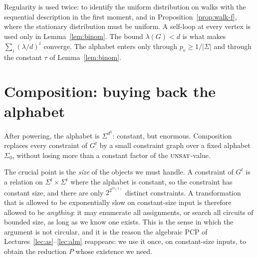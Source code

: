 \begin{remark}\label{rem:hypotheses}
Regularity is used twice: to identify the uniform distribution on walks with the sequential description in the first moment, and in Proposition~\ref{prop:walk-f}, where the stationary distribution must be uniform.
A self-loop at every vertex is used only in Lemma~\ref{lem:binom}.  The bound $\lambda(G)<d$ is what makes $\sum_i(\lambda/d)^i$ converge.  The alphabet enters only through $p_v\ge1/|\Sigma|$ and through the constant $\tau$ of Lemma~\ref{lem:binom}.
\end{remark}


\section{Composition: buying back the alphabet}
\label{sec:comp}

After powering, the alphabet is $\Sigma^{d^{h}}$: constant, but enormous.  Composition replaces every constraint of $G^t$ by a small constraint graph over a fixed alphabet $\Sigma_0$, without losing more than a constant factor of the $\textsc{unsat}$-value.

The crucial point is the \emph{size} of the objects we must handle.  A constraint of $G^t$ is a relation on $\Sigma^{t}\times\Sigma^{t}$ where the alphabet is constant, so the constraint has constant size, and there are only $2^{2^{O(1)}}$ distinct constraints.  A transformation that is allowed to be exponentially slow on constant-size input is therefore allowed to be \emph{anything}: it may enumerate all assignments, or search all circuits of bounded size, as long as we know one exists.
This is the sense in which the argument is not circular, and it is the reason the algebraic PCP of Lectures~\ref{lec:as}--\ref{lec:alm} reappears: we use it once, on constant-size inputs, to obtain the reduction $P$ whose existence we need.

